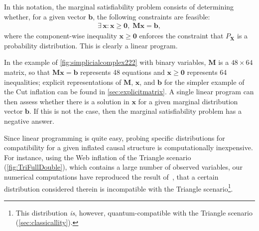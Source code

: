 \documentclass[aps,english,10pt,superscriptaddress,onecolumn,twoside,longbibliography,pra,floatfix,fleqn,nofootinbib]{revtex4-1}
\theoremstyle{definition}
\newcounter{example}[section]
\begin{document}
In this notation, the marginal satisfiability problem consists of determining whether, for a given vector $\bm{b}$, the following constraints are feasible:
\begin{align}\label{eq:marginalproblemgeneric}
    \exists\, \bm{x} :{\bm{x} \geq \bm{0}} ,\; \bm{M}\bm{x}=\bm{b},
\end{align}
where the component-wise inequality $\bm{x}\geq\bm{0}$ enforces the constraint that $P_{\bm{X}}$ is a probability distribution. 
This is clearly a linear program.

In the example of \cref{fig:simplicialcomplex222} with binary variables, $\bm{M}$ is a $48\times 64$ matrix, so that $\bm{M}\bm{x}=\bm{b}$ represents 48 equations and $\bm{x} \geq \bm{0}$ represents 64 inequalities; explicit representations of  $\bm{M}$, $\bm{x}$, and $\bm{b}$ for the simpler example of the Cut inflation can be found in \cref{sec:explicitmatrix}.
A single linear program can then assess whether there is a solution in $\bm{x}$ for a given marginal distribution vector $\bm{b}$. If this is not the case, then the marginal satisfiability problem has a negative answer. 

Since linear programming is quite easy, probing specific distributions for compatibility for a given inflated causal structure is computationally inexpensive. For instance, using the Web inflation of the Triangle scenario (\cref{fig:TriFullDouble}), which contains a large number of observed variables, our numerical computations have reproduced the result of~\cite[Theorem~2.16]{fritz2012bell}, that a certain distribution considered therein is incompatible with the Triangle scenario\footnote{This distribution {\em is}, however, quantum-compatible with the Triangle scenario (\cref{sec:classicallity}).}.
\end{document}
